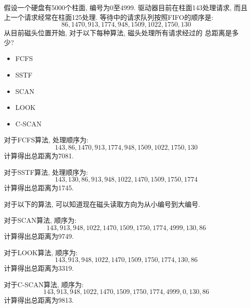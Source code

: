 \begin{problem}
    假设一个硬盘有5000个柱面, 编号为0至4999.
    驱动器目前在柱面143处理请求, 而且上一个请求经常在柱面125处理.
    等待中的请求队列按照FIFO的顺序是:
    \[86,1470,913,1774,948,1509,1022,1750,130\]
    从目前磁头位置开始, 对于以下每种算法, 磁头处理所有请求经过的
    总距离是多少?
    \begin{itemize}
        \item FCFS
        \item SSTF
        \item SCAN
        \item LOOK
        \item C-SCAN
    \end{itemize}

\begin{answer}
    对于FCFS算法, 处理顺序为:
    \[143,86,1470,913,1774,948,1509,1022,1750,130\]
    计算得出总距离为7081.

    对于SSTF算法, 处理顺序为:
    \[143,130,86,913,948,1022,1470,1509,1750,1774\]
    计算得出总距离为1745.

    对于以下的算法, 可以知道现在磁头读取方向为从小编号到大编号.

    对于SCAN算法, 顺序为:
    \[143,913,948,1022,1470,1509,1750,1774,4999,130,86\]
    计算得出总距离为9749.

    对于LOOK算法, 顺序为:
    \[143,913,948,1022,1470,1509,1750,1774,130,86\]
    计算得出总距离为3319.

    对于C-SCAN算法, 顺序为:
    \[143,913,948,1022,1470,1509,1750,1774,4999,0,130,86\]
    计算得出总距离为9813.


\end{answer}

\end{problem}
